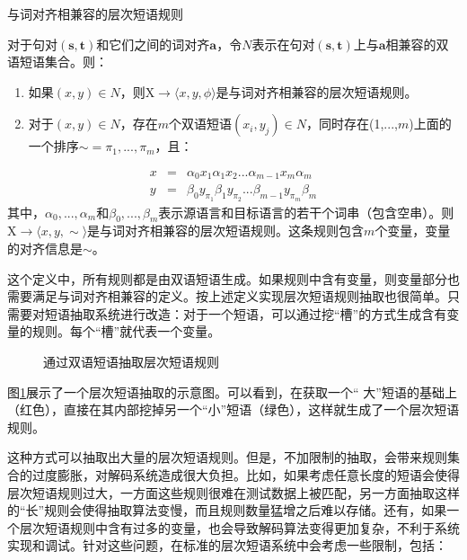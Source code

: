 \vspace{0.5em}
\begin{definition} 与词对齐相兼容的层次短语规则

{\small
对于句对$(\mathbf{s},\mathbf{t})$和它们之间的词对齐$\mathbf{a}$，令$N$表示在句对$(\mathbf{s},\mathbf{t})$上与$\mathbf{a}$相兼容的双语短语集合。则：
\begin{enumerate}
\item 	如果$(x,y)\in N$，则$\textrm{X} \to \langle x,y,\phi \rangle$是与词对齐相兼容的层次短语规则。
\item 	对于$(x,y)\in N$，存在$m$个双语短语$(x_i,y_j)\in N$，同时存在(1,$...$,$m$)上面的一个排序$\sim = {\pi_1 , ... ,\pi_m}$，且：
\end{enumerate}
\vspace{-1.5em}
\begin{eqnarray}
x&=&\alpha_0 x_1 \alpha_1 x_2 ... \alpha_{m-1} x_m \alpha_m \label{eqa4.23}\\
y&=&\beta_0 y_{\pi_1} \beta_1 y_{\pi_2} ... \beta_{m-1} y_{\pi_m} \beta_m
\label{eq:4-24}
\end{eqnarray}
其中，${\alpha_0, ... ,\alpha_m}$和${\beta_0, ... ,\beta_m}$表示源语言和目标语言的若干个词串（包含空串）。则$\textrm{X} \to \langle x,y,\sim \rangle$是与词对齐相兼容的层次短语规则。这条规则包含$m$个变量，变量的对齐信息是$\sim$。
}
\end{definition}

\parinterval 这个定义中，所有规则都是由双语短语生成。如果规则中含有变量，则变量部分也需要满足与词对齐相兼容的定义。按上述定义实现层次短语规则抽取也很简单。只需要对短语抽取系统进行改造：对于一个短语，可以通过挖``槽''的方式生成含有变量的规则。每个``槽''就代表一个变量。

\begin{figure}[htp]
\centering

\caption{通过双语短语抽取层次短语规则}
\label{fig:4-34}
\end{figure}

\parinterval 图\ref{fig:4-34}展示了一个层次短语抽取的示意图。可以看到，在获取一个`` 大''短语的基础上（红色），直接在其内部挖掉另一个``小''短语（绿色），这样就生成了一个层次短语规则。

\parinterval 这种方式可以抽取出大量的层次短语规则。但是，不加限制的抽取，会带来规则集合的过度膨胀，对解码系统造成很大负担。比如，如果考虑任意长度的短语会使得层次短语规则过大，一方面这些规则很难在测试数据上被匹配，另一方面抽取这样的``长''规则会使得抽取算法变慢，而且规则数量猛增之后难以存储。还有，如果一个层次短语规则中含有过多的变量，也会导致解码算法变得更加复杂，不利于系统实现和调试。针对这些问题，在标准的层次短语系统中会考虑一些限制，包括：

